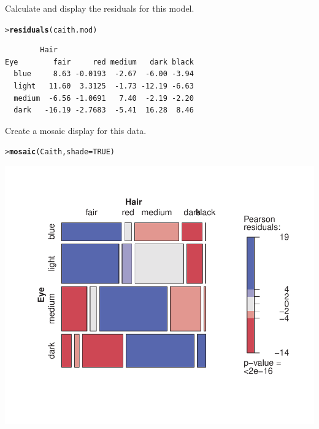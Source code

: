 \documentclass[10pt]{report}\usepackage[]{graphicx}\usepackage[]{color}
\makeatletter
\newcommand{\hlnum}[1]{\textcolor[rgb]{0.686,0.059,0.569}{#1}}%
\newcommand{\hlstd}[1]{\textcolor[rgb]{0.345,0.345,0.345}{#1}}%
\newcommand{\hlkwc}[1]{\textcolor[rgb]{0.333,0.667,0.333}{#1}}%
\newcommand{\hlkwd}[1]{\textcolor[rgb]{0.737,0.353,0.396}{\textbf{#1}}}%
\newenvironment{kframe}{%
 \def\at@end@of@kframe{}%
 \ifinner\ifhmode%
  \def\at@end@of@kframe{\end{minipage}}%
  \begin{minipage}{\columnwidth}%
 \fi\fi%
 \def\FrameCommand##1{\hskip\@totalleftmargin \hskip-\fboxsep
 \colorbox{shadecolor}{##1}\hskip-\fboxsep
     \hskip-\linewidth \hskip-\@totalleftmargin \hskip\columnwidth}%
 \MakeFramed {\advance\hsize-\width
   \@totalleftmargin\z@ \linewidth\hsize
   \@setminipage}}%
 {\par\unskip\endMakeFramed%
 \at@end@of@kframe}
\newenvironment{knitrout}{}{} %
\renewenvironment{knitrout}{\small\renewcommand{\baselinestretch}{.85}}{} %
\makeatother
\begin{document}
\begin{Exercises}
\begin{enumerate*}
    
    \item Calculate and display the residuals for this model.
    \begin{ans}
\begin{knitrout}\footnotesize
{}\color{fgcolor}\begin{kframe}
\begin{alltt}
\hlstd{> }\hlkwd{residuals}\hlstd{(caith.mod)}
\end{alltt}
\begin{verbatim}
        Hair
Eye        fair     red medium   dark black
  blue     8.63 -0.0193  -2.67  -6.00 -3.94
  light   11.60  3.3125  -1.73 -12.19 -6.63
  medium  -6.56 -1.0691   7.40  -2.19 -2.20
  dark   -16.19 -2.7683  -5.41  16.28  8.46
\end{verbatim}
\end{kframe}
\end{knitrout}
    \end{ans}
    
    \item Create a mosaic display for this data.
    \begin{ans}
\begin{knitrout}\footnotesize
{}\color{fgcolor}\begin{kframe}
\begin{alltt}
\hlstd{> }\hlkwd{mosaic}\hlstd{(Caith,} \hlkwc{shade}\hlstd{=}\hlnum{TRUE}\hlstd{)}
\end{alltt}
\end{kframe}

\centerline{\includegraphics[width=.6\textwidth]{soln/fig/ex5_7d-1} }



\end{knitrout}

    \end{ans}
    

\end{enumerate*}
\end{Exercises}
\end{document}
